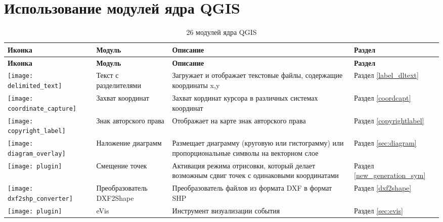 
\chapter{Использование модулей ядра QGIS}\label{sec:core_plugins}


{\setlength{\extrarowheight}{15pt}
\small
\begin{longtable}{|p{1.2cm}|p{3.8cm}|p{7.5cm}|p{3cm}|}
\caption{26 модулей ядра QGIS }\label{tab:core_plugins} \\
\hline
 \textbf{Иконка} & \textbf{Модуль} & \textbf{Описание} & \textbf{Раздел}\\
\endfirsthead
\hline
\textbf{Иконка} & \textbf{Модуль} & \textbf{Описание} & \textbf{Раздел}\\
\endhead
\hline
\texttt{[image: delimited\_text]}
 & Текст с разделителями \index{модули!текст с разделителями} & Загружает и отображает текстовые файлы, содержащие координаты x,y & Раздел \ref{label_dltext}\\
\hline
\texttt{[image: coordinate\_capture]}
 & Захват координат \index{модули!захват координат}& Захват кординат курсора в различных системах координат & Раздел \ref{coordcapt}\\
\hline
\texttt{[image: copyright\_label]}
 & Знак авторского права \index{модули!знак авторского права}& Отображает на карте знак авторского права & Раздел \ref{copyrightlabel}\\
\hline
\texttt{[image: diagram\_overlay]}
 & Наложение диаграмм \index{модули!диаграмма}& Размещает диаграмму (круговую или гистограмму) или пропорциональные символы на векторном слое & Раздел \ref{sec:diagram}\\
\hline
\texttt{[image: plugin]}
 & Смещение точек \index{plugins!point displacement}& Активация режима отрисовки, который делает возможным сдвиг точек с одинаковыми координатами & Раздел \ref{new_generation_sym}\\
\hline
\texttt{[image: dxf2shp\_converter]}
 & Преобразователь DXF2Shape \index{модули!DXF2Shape}& Преобразователь файлов из формата DXF в формат SHP & Раздел \ref{dxf2shape}\\
\hline
\texttt{[image: plugin]}
 & eVis & Инструмент визуализации события & Раздел \ref{sec:evis}\\

\end{longtable}}
